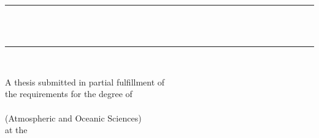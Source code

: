 \documentclass[12pt,letterpaper,oneside]{Thesis}
\title{\ttitle}
\begin{document}
\frontmatter 


\fancyhead{} %
\rhead{\thepage} %
\lhead{}

\pagestyle{fancy}

\newcommand{\HRule}{\rule{\linewidth}{0.5mm}}

\hypersetup{pdfauthor=\authornames}

\makeatletter
\renewcommand\chapter{\if@openright\cleardoublepage\else\clearpage\fi
                    \thispagestyle{fancy}%
                    \global\@topnum\z@
                    \@afterindentfalse
                    \secdef\@chapter\@schapter}
\makeatother


\begin{titlepage}
\begin{center}


\HRule \\[0.4cm] %
{\huge \bfseries \ttitle}\\[0.4cm] %
\HRule \\[1.5cm] %

\begin{center} \large
\authornames 
\end{center}
 
\large A thesis submitted in partial fulfillment of \\ the requirements for the degree of\\[1cm]
\degreename \\
(Atmospheric and Oceanic Sciences) \\[1cm]
 at the\\
\textsc{\univname}\\
{\large \graduationmonth \ \graduationyear}\\[4cm] %
 
\vfill
\end{center}

\end{titlepage}
\end{document}
